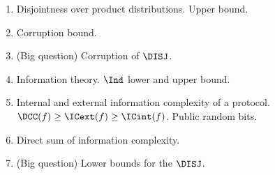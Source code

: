 \begin{enumerate}
    \item Disjointness over product distributions. Upper bound.
    \item Corruption bound.
    \item (Big question) Corruption of $\DISJ$.    
    \item Information theory. $\Ind$ lower and upper bound.
    \item Internal and external information complexity of a protocol. $\DCC(f) \ge \ICext(f) \ge \ICint(f)$.
        Public random bits.
    \item Direct sum of information complexity.
    \item (Big question) Lower bounds for the $\DISJ$.
\end{enumerate}




